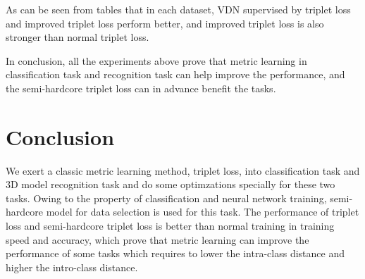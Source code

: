 \documentclass[11pt,onecolumn,letterpaper]{article}
\begin{document}
\begin{table}[!htbp]
\renewcommand{\arraystretch}{1.3}
\centering
\caption{Performance comparision of 3D shape recognition on ShapeNet Core55 normal datasets}
\label{SHREC_normal}
\end{table}

\begin{table}[!htbp]
\renewcommand{\arraystretch}{1.3}
\centering
\caption{Performance comparision of 3D shape recognition on ShapeNet Core55 perturbed datasets}
\label{SHREC_perturbed}
\end{table}

As can be seen from tables that in each dataset, VDN supervised by triplet loss and improved triplet loss perform better, and improved triplet loss is also stronger than normal triplet loss. 

In conclusion, all the experiments above prove that metric learning in classification task and recognition task can help improve the performance, and the semi-hardcore triplet loss can in advance benefit the tasks.

\section{Conclusion}
We exert a classic metric learning method, triplet loss, into classification task and 3D model recognition task and do some optimzations specially for these two tasks. Owing to the property of classification and neural network training, semi-hardcore model for data selection is used for this task. The performance of triplet loss and semi-hardcore triplet loss is better than normal training in training speed and accuracy, which prove that metric learning can improve the performance of some tasks which requires to lower the intra-class distance and higher the intro-class distance.


{\small

}
\end{document}
